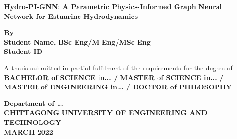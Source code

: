 \begin{titlepage}
\begin{center}
    \vspace*{1cm}
    
    \textbf{\Large Hydro-PI-GNN: A Parametric Physics-Informed Graph Neural Network for Estuarine Hydrodynamics}
    
    \vspace{1.5cm}
    
    \textbf{By} \\
    \textbf{Student Name, BSc Eng/M Eng/MSc Eng} \\
    \textbf{Student ID}
    
    \vspace{2cm}
    
    A thesis submitted in partial fulfilment of the requirements for the degree of \\
    \textbf{BACHELOR of SCIENCE in... / MASTER of SCIENCE in... / MASTER of ENGINEERING in... / DOCTOR of PHILOSOPHY}
    
    \vspace{2cm}
    
    \textbf{Department of ...} \\
    \textbf{CHITTAGONG UNIVERSITY OF ENGINEERING AND TECHNOLOGY} \\
    \textbf{MARCH 2022}
    
\end{center}
\end{titlepage}
